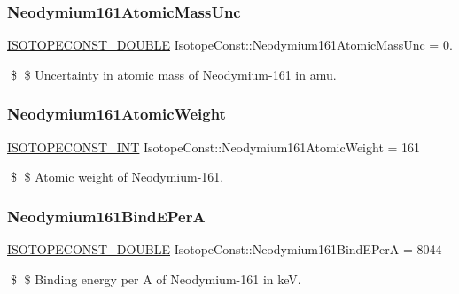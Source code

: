 \subsubsection{\texorpdfstring{Neodymium161\+Atomic\+Mass\+Unc}{Neodymium161AtomicMassUnc}}
{\footnotesize\ttfamily \mbox{\hyperlink{group___isotope_const-_macros_ga8f45a7272ce02c0b4c65c44636ed719a}{I\+S\+O\+T\+O\+P\+E\+C\+O\+N\+S\+T\+\_\+\+D\+O\+U\+B\+LE}} Isotope\+Const\+::\+Neodymium161\+Atomic\+Mass\+Unc = 0.}

\$ \$ Uncertainty in atomic mass of Neodymium-\/161 in amu. \mbox{\label{group___isotope_const-_neodymium-_nd161_gae7b35675e83458ca8c6c64e7095ab6db}} 
\subsubsection{\texorpdfstring{Neodymium161\+Atomic\+Weight}{Neodymium161AtomicWeight}}
{\footnotesize\ttfamily \mbox{\hyperlink{group___isotope_const-_macros_ga5f18360b3e99483a35c32d789e62621c}{I\+S\+O\+T\+O\+P\+E\+C\+O\+N\+S\+T\+\_\+\+I\+NT}} Isotope\+Const\+::\+Neodymium161\+Atomic\+Weight = 161}

\$ \$ Atomic weight of Neodymium-\/161. \mbox{\label{group___isotope_const-_neodymium-_nd161_gaaa28a016341d52839989eb7d92d3a68f}} 
\subsubsection{\texorpdfstring{Neodymium161\+Bind\+E\+PerA}{Neodymium161BindEPerA}}
{\footnotesize\ttfamily \mbox{\hyperlink{group___isotope_const-_macros_ga8f45a7272ce02c0b4c65c44636ed719a}{I\+S\+O\+T\+O\+P\+E\+C\+O\+N\+S\+T\+\_\+\+D\+O\+U\+B\+LE}} Isotope\+Const\+::\+Neodymium161\+Bind\+E\+PerA = 8044}

\$ \$ Binding energy per A of Neodymium-\/161 in keV. \mbox{\label{group___isotope_const-_neodymium-_nd161_gab3729a76b949ed88672ea717bd23541a}} 
